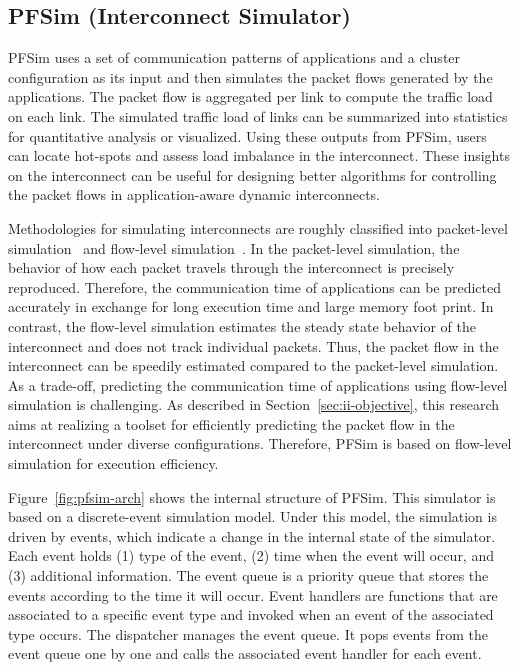 \subsection{PFSim (Interconnect Simulator)}\label{sec:ii-pfsim}

PFSim uses a set of communication patterns of applications and a cluster
configuration as its input and then simulates the packet flows generated
by the applications. The packet flow is aggregated per link to compute
the traffic load on each link. The simulated traffic load of links can
be summarized into statistics for quantitative analysis or visualized.
Using these outputs from PFSim, users can locate hot-spots and assess
load imbalance in the interconnect. These insights on the interconnect
can be useful for designing better algorithms for controlling the packet
flows in application-aware dynamic interconnects.

Methodologies for simulating interconnects are roughly classified into
packet-level simulation~\cite{Hoefler2010} and flow-level
simulation~\cite{Schneider2009}. In the packet-level simulation, the behavior
of how each packet travels through the interconnect is precisely reproduced.
Therefore, the communication time of applications can be predicted accurately
in exchange for long execution time and large memory foot print. In contrast,
the flow-level simulation estimates the steady state behavior of the
interconnect and does not track individual packets. Thus, the packet flow in
the interconnect can be speedily estimated compared to the packet-level
simulation. As a trade-off, predicting the communication time of applications
using flow-level simulation is challenging. As described in
Section~\ref{sec:ii-objective}, this research aims at realizing a toolset for
efficiently predicting the packet flow in the interconnect under diverse
configurations. Therefore, PFSim is based on flow-level simulation for
execution efficiency.

Figure~\ref{fig:pfsim-arch} shows the internal structure of PFSim. This
simulator is based on a discrete-event simulation model. Under this model, the
simulation is driven by events, which indicate a change in the internal state
of the simulator. Each event holds (1) type of the event, (2) time when the
event will occur, and (3) additional information. The event queue is a
priority queue that stores the events according to the time it will occur.
Event handlers are functions that are associated to a specific event type and
invoked when an event of the associated type occurs. The dispatcher manages
the event queue. It pops events from the event queue one by one and calls the
associated event handler for each event.

